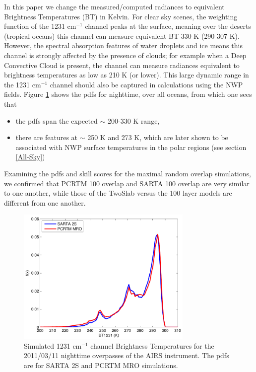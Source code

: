 \documentclass[agupp]{aguplus}              %
\newcommand{\wn}{cm$^{-1}$\xspace}
\begin{document}
\begin{article}
In this paper we change the measured/computed radiances to equivalent
Brightness Temperatures (BT) in Kelvin.  For clear sky scenes, the
weighting function of the 1231 \wn channel peaks at the surface,
meaning over the deserts (tropical oceans) this channel can measure
equivalent BT 330 K (290-307 K). However, the spectral absorption
features of water droplets and ice means this channel is strongly
affected by the presence of clouds; for example when a Deep Convective
Cloud is present, the channel can measure radiances equivalent to
brightness temperatures as low as 210 K (or lower). This large dynamic
range in the 1231 \wn channel should also be captured in calculations
using the NWP fields. Figure \ref{SvsPalloceanPDF} shows the pdfs for
nighttime, over all oceans, from which one sees that

\begin{itemize} 
  \item the pdfs span the expected $\sim$ 200-330 K range,
  \item there are features at $\sim$ 250 K and 273 K, which are later shown to be associated with 
        NWP surface temperatures in the polar regions (see section \ref{All-Sky})
\end{itemize}

Examining the pdfs and skill scores for the maximal random overlap simulations,
we confirmed that PCRTM 100 overlap and SARTA 100 overlap are very similar to one
another, while those of the TwoSlab versus the 100 layer models are
different from one another.

\begin{figure}[h]
\noindent\includegraphics[width=20pc]{FIGS/ecm_cloudBT1231_gev_ocean_SvsP2A}
\caption{Simulated 1231 \wn channel Brightness Temperatures for the 2011/03/11 nighttime
overpasses of the AIRS instrument. The pdfs are for SARTA 2S and PCRTM MRO simulations.}
\label{SvsPalloceanPDF} 
\end{figure}


\end{article}
\end{document}
